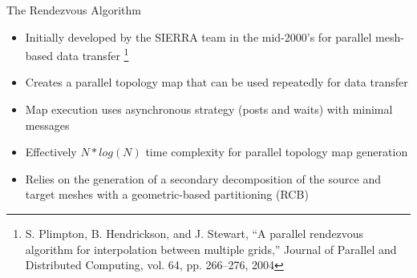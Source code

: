 \documentclass{beamer}
\begin{document}
\begin{frame}{The Rendezvous Algorithm}

  \begin{itemize}
    \item Initially developed by the SIERRA team in the mid-2000's for
      parallel mesh-based data transfer \footnote{S. Plimpton,
        B. Hendrickson, and J. Stewart, “A parallel rendezvous
        algorithm for interpolation between multiple grids,” Journal
        of Parallel and Distributed Computing, vol. 64, pp. 266–276,
        2004}
      \medskip
    \item Creates a parallel topology map that can be used repeatedly
      for data transfer
    \item Map execution uses asynchronous strategy (posts and waits)
      with minimal messages
    \item Effectively $N*log(N)$ time complexity for parallel topology
      map generation
      \medskip
    \item Relies on the generation of a secondary decomposition of the
      source and target meshes with a geometric-based partitioning
      (RCB)
  \end{itemize}

\end{frame}
\end{document}
